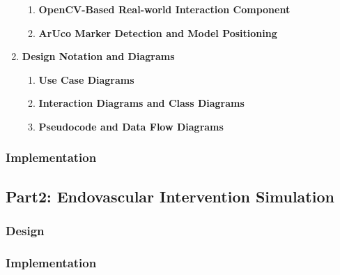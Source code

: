 \documentclass[12pt]{article}
\begin{document}
\begin{enumerate}
\begin{enumerate}
              \item \textbf{OpenCV-Based Real-world Interaction Component}

              \item \textbf{ArUco Marker Detection and Model Positioning}
          \end{enumerate}


    \item \textbf{Design Notation and Diagrams}
          \begin{enumerate}
              \item \textbf{Use Case Diagrams}

              \item \textbf{Interaction Diagrams and Class Diagrams}

              \item \textbf{Pseudocode and Data Flow Diagrams}
          \end{enumerate}
\end{enumerate}

\subsubsection{Implementation}

\subsection{Part2: Endovascular Intervention Simulation}

\subsubsection{Design}

\subsubsection{Implementation}
\end{document}
